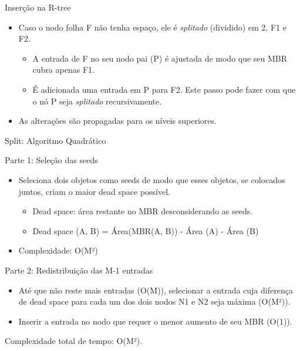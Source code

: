 \documentclass[compress,aspectratio=169]{beamer}
\begin{document}
\begin{frame}{Inserção na R-tree}
    \begin{justify}
        \begin{itemize}
            \item Caso o nodo folha F não tenha espaço, ele é \textit{splitado} (dividido) em 2, F1 e F2.
                \begin{itemize}
                    \item A entrada de F no seu nodo pai (P) é ajustada de modo que seu MBR cubra apenas F1.
                    \item É adicionada uma entrada em P para F2. Este passo pode fazer com que o nó P seja \textit{splitado} recursivamente.
                \end{itemize}
            \item As alterações são propagadas para os níveis superiores.
        \end{itemize}
    \end{justify}
\end{frame}

\begin{frame}{Split: Algoritmo Quadrático}
    \par Parte 1: Seleção das seeds
    \begin{itemize}
        \item Seleciona dois objetos como seeds de modo que esses objetos, se colocados juntos, criam o maior dead space possível.
        \begin{itemize}
            \item Dead space: área restante no MBR desconsiderando as seeds.
            \item Dead space (A, B) = Área(MBR(A, B)) - Área (A) - Área (B)
        \end{itemize}
        \item Complexidade: O(M²)
    \end{itemize}

    \par Parte 2: Redistribuição das M-1 entradas
    \begin{itemize}
        \item Até que não reste mais entradas (O(M)), selecionar a entrada cuja diferença de dead space para cada um dos dois nodos N1 e N2 seja máxima (O(M²)).
        \item Inserir a entrada no nodo que requer o menor aumento de seu MBR (O(1)).
    \end{itemize}

    \par Complexidade total de tempo: O(M²).
\end{frame}
\end{document}
